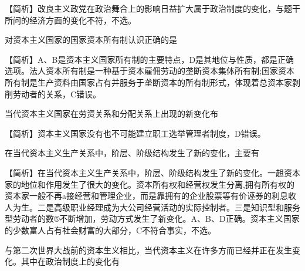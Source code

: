 \begin{solution}【简析】改良主义政党在政治舞合上的影响日益扩大属于政治制度的变化，与题干所问的经济方面的变化不符，不选。
\end{solution}
\question 对资本主义国家的国家资本所有制认识正确的是
\par{}
\begin{solution}【简析】A、B是资本主义国家所有制的主要特点，D是其地位与性质，都是正确选项。法人资本所有制是一种基于资本雇佣劳动的垄断资本集体所有制;国家资本所有制是生产资料由国家占有并服务于垄断资本的所有制形式，体现着总资本家剥削劳动者的关系，C错误。
\end{solution}
\question 当代资本主义国家在劳资关系和分配关系上出现的新变化布
\par{}
\begin{solution}【简析】资本主义国家没有也不可能建立职工选举管理者制度，D错误。
\end{solution}
\question 在当代资本主义生产关系中，阶层、阶级结构发生了新的变化，主要有
\par{}
\begin{solution}【简析】在当代资本主义生产关系中，阶层、阶级结构发生了新的变化。一趄资本家的地位和作用发生了很大的变化。资本所有权和经营权发生分离,拥有所有权的资本家一般不再a接经营和管理企业，而是靠拥有的企业股票等有价诬券的利息收人为生。二是高级职业经理成为大公司经营活动的实际控制者。三是知识型和服务型劳动者的数®不断增加，劳动方式发生了新变化。A、B、D正确。资本主义国家的少数富人占有社会财富的大部分，C不符合事实，不选。
\end{solution}
\question 与第二次世界大战前的资本生义相比，当代资本主义在许多方而已经并正在发生变化。其中在政治制度上的变化有
\par{}
